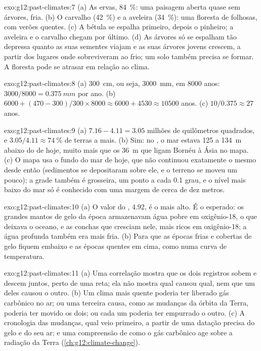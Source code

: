 \begin{solution}{exo:g12:past-climates:7}
(a) As ervas, \qty{84}{\percent}: uma paisagem aberta quase sem árvores,
fria. (b) O carvalho (\qty{42}{\percent}) e a aveleira (\qty{34}{\percent}):
uma floresta de folhosas, com verões quentes. (c) A bétula se espalha
primeiro, depois o pinheiro; a aveleira e o carvalho chegam por último.
(d) As árvores só se espalham tão depressa quanto as suas sementes viajam e
as suas árvores jovens crescem, a partir dos lugares onde sobreviveram ao
frio; um solo também precisa se formar. A floresta pode se atrasar em
relação ao clima.
\end{solution}

\begin{solution}{exo:g12:past-climates:8}
(a) \qty{300}{cm}, ou seja, \qty{3000}{mm}, em \num{8000} anos: $3000/8000 =
\qty{0.375}{mm}$ por ano. (b) $\num{6000} + (470 - 300)/300 \times \num{8000}
\approx \num{6000} + \num{4530} \approx \num{10500}$ anos. (c) $10/0.375
\approx 27$ anos.
\end{solution}

\begin{solution}{exo:g12:past-climates:9}
(a) $7.16 - 4.11 = 3.05$ milhões de quilômetros quadrados, e $3.05/4.11 \approx
\qty{74}{\percent}$ de terras a mais. (b) Sim: no , o
mar estava 125 a \qty{134}{m} abaixo do de hoje, muito mais que os
\qty{36}{m} que ligam Bornéu à Ásia no mapa. (c) O mapa usa o fundo do mar de hoje, que não
continuou exatamente o mesmo desde então (sedimentos se depositaram sobre
ele, e o terreno se moveu um pouco); a grade também é grosseira, um ponto a
cada 0.1 grau, e o nível mais baixo do mar só é conhecido com uma margem de
cerca de dez metros.
\end{solution}

\begin{solution}{exo:g12:past-climates:10}
(a) O valor do , \qty{4.92}{\permil}, é o mais alto.
É o esperado: os grandes mantos de gelo da época armazenavam água pobre em
oxigênio-18, o que deixava o oceano, e as conchas que cresciam nele, mais
ricos em oxigênio-18; a água profunda também era mais fria. (b) Para que as
épocas frias e cobertas de gelo fiquem embaixo e as épocas quentes em cima,
como numa curva de temperatura.
\end{solution}

\begin{solution}{exo:g12:past-climates:11}
(a) Uma correlação mostra que os dois registros sobem e descem juntos, perto
de uma reta; ela não mostra qual causou qual, nem que um deles causou o
outro. (b) Um clima mais quente poderia ter liberado gás carbônico no ar; ou
uma terceira causa, como as mudanças da órbita da Terra, poderia ter movido
os dois; ou cada um poderia ter empurrado o outro. (c) A cronologia das
mudanças, qual veio primeiro, a partir de uma datação precisa do gelo e do
seu ar; e uma compreensão de como o gás carbônico age sobre a radiação da
Terra (\cref{ch:g12:climate-change}).
\end{solution}

